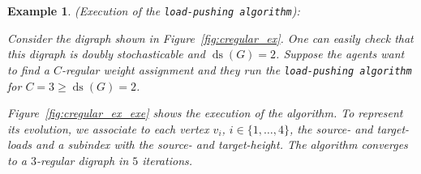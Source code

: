 \documentclass[final]{siamltex}
\newtheorem{example}[theorem]{Example}
\begin{document}
\begin{example}{\mbox{}\textup{({Execution of the
    {\texttt{load-pushing algorithm}\xspace}}):}}\label{example:cregular_ex}
  {\rm Consider the digraph shown in Figure~\ref{fig:cregular_ex}.
  One can easily check that this digraph is doubly stochasticable and
  $ {\operatorname{ds}}(G)=2 $. Suppose the agents want to find a $C$-regular weight
  assignment and they run the {\texttt{load-pushing algorithm}\xspace} for $C=3 \geq {\operatorname{ds}}(G) =2$.
    
    
    
    
    
    Figure~\ref{fig:cregular_ex_exe} shows the execution of the
    algorithm. To represent its evolution, we associate to each vertex
    $ v_i $, $ i\in \{1,\ldots, 4\} $, the source- and target-loads
    and a subindex with the source- and target-height.  The algorithm
    converges to a $ 3 $-regular digraph in $ 5 $ iterations.  }
  {\relax\ifmmode\else\unskip\hfill\fi{\hbox{$\bullet$}}}


\end{example}
\end{document}
